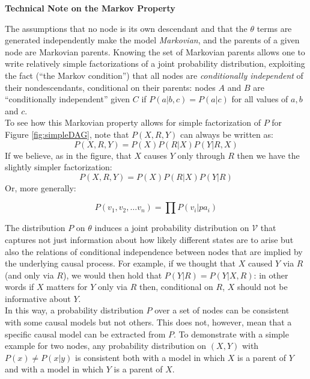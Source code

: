 \documentclass[
  12pt,
]{book}
\newenvironment{headerbox}{
  \definecolor{shadecolor}{rgb}{0.8, 0.8, 0.8}  %
  \color{black}
  \begin{shaded}}{\end{shaded}}
\begin{document}
\begin{headerbox}

\leavevmode\hypertarget{markov}{}%
\begin{center}
\textbf{Technical Note on the Markov Property}

\end{center}

The assumptions that no node is its own descendant and that the \(\theta\) terms are generated independently make the model \emph{Markovian}, and the parents of a given node are Markovian parents. Knowing the set of Markovian parents allows one to write relatively simple factorizations of a joint probability distribution, exploiting the fact (``the Markov condition'') that all nodes are \emph{conditionally independent} of their nondescendants, conditional on their parents: nodes \(A\) and \(B\) are ``conditionally independent'' given \(C\) if \(P(a|b,c) = P(a|c)\) for all values of \(a, b\) and \(c\).\\
To see how this Markovian property allows for simple factorization of \(P\) for Figure \ref{fig:simpleDAG}, note that \(P(X, R, Y)\) can always be written as:
\[P(X, R, Y) = P(X)P(R|X)P(Y|R, X)\]
If we believe, as in the figure, that \(X\) causes \(Y\) only through \(R\) then we have the slightly simpler factorization:
\[P(X, R, Y) = P(X)P(R|X)P(Y|R)\]
Or, more generally:

\begin{equation} 
P(v_1,v_2,\dots v_n) = \prod P(v_i|pa_i)
\label{eq:markov}
\end{equation}

The distribution \(P\) on \(\theta\) induces a joint probability distribution on \(\mathcal{V}\) that captures not just information about how likely different states are to arise but also the relations of conditional independence between nodes that are implied by the underlying causal process. For example, if we thought that \(X\) caused \(Y\) via \(R\) (and only via \(R\)), we would then hold that \(P(Y | R) = P(Y | X, R)\): in other words if \(X\) matters for \(Y\) only via \(R\) then, conditional on \(R\), \(X\) should not be informative about \(Y\).\\
In this way, a probability distribution \(P\) over a set of nodes can be consistent with some causal models but not others. This does not, however, mean that a specific causal model can be extracted from \(P\). To demonstrate with a simple example for two nodes, any probability distribution on \((X,Y)\) with \(P(x)\neq P(x|y)\) is consistent both with a model in which \(X\) is a parent of \(Y\) and with a model in which \(Y\) is a parent of \(X\).

\end{headerbox}
\end{document}
